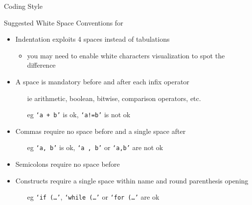 \documentclass[presentation]{beamer}
\begin{document}
\begin{frame}{\csharp Coding Style}
    \begin{exampleblock}{Suggested White Space Conventions for \csharp}
        \begin{itemize}
            \item Indentation exploits 4 spaces \alert{instead of} tabulations
            \begin{itemize}
                \item you may need to enable white characters visualization to spot the difference
            \end{itemize} 
            \item A space is mandatory \alert{before and after} each \alert{infix} operator
            \begin{itemize}
                \item[ie] arithmetic, boolean, bitwise, comparison operators, etc.
                \item[eg] \texttt{`a + b'} is ok, \texttt{`a!=b'} is not ok
            \end{itemize}
            \item Commas require \alert{no space before} and a \alert{single space after}
            \begin{itemize}
                \item[eg] \texttt{`a, b'} is ok, \texttt{`a , b'} or \texttt{`a,b'} are not ok
            \end{itemize} 
            \item Semicolons require \alert{no space before} 
            \item Constructs require \alert{a single space} within name and round parenthesis opening
            \begin{itemize}
                \item[eg] \texttt{`if (\ldots'}, \texttt{`while (\ldots'} or \texttt{`for (\ldots'} are ok
            \end{itemize} 
        \end{itemize}
    \end{exampleblock}


\end{frame}
\end{document}
